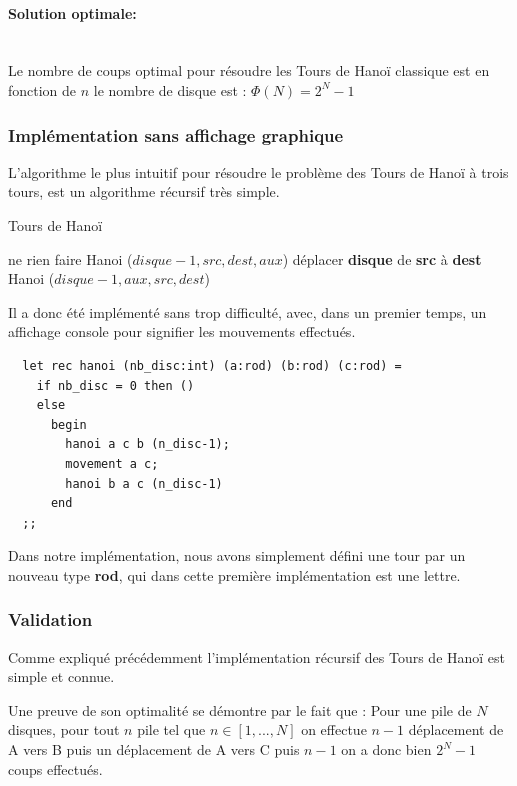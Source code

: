 \documentclass[a4paper,11pt]{article}
\begin{document}
\paragraph{Solution optimale:}\mbox{}\\
Le nombre de coups optimal pour résoudre les Tours de Hanoï classique est en fonction de $n$ le nombre de disque est : \(\Phi(N) = 2^{N}-1\)
\newpage
\subsubsection{Implémentation sans affichage graphique}
\label{sec:algoBase}
L'algorithme le plus intuitif pour résoudre le problème des Tours de Hanoï à trois tours,
est un algorithme récursif très simple.

\begin{algorithm}
  \caption{Tours de Hanoï}\label{algo:hanoi1}
  \begin{algorithmic}[1]
     
    ne rien faire
    \Else
    \State Hanoi ($disque - 1, src, dest, aux$)
    \State déplacer \textbf{disque} de \textbf{src} à \textbf{dest}
    \State Hanoi ($disque - 1, aux, src, dest$)
    \EndIf
    \EndProcedure
\end{algorithmic}
\end{algorithm}

Il a donc été implémenté sans trop difficulté, avec, dans un premier temps,  un affichage console pour signifier les mouvements effectués.
\begin{lstlisting}
  let rec hanoi (nb_disc:int) (a:rod) (b:rod) (c:rod) =
    if nb_disc = 0 then ()
    else
      begin
        hanoi a c b (n_disc-1);
        movement a c;
        hanoi b a c (n_disc-1)
      end
  ;;
\end{lstlisting}

Dans notre implémentation, nous avons simplement défini une tour par un nouveau type \textbf{rod}, qui dans cette première implémentation est une lettre.

\subsubsection{Validation}

Comme expliqué précédemment l'implémentation récursif des Tours de Hanoï est simple et connue.

Une preuve de son optimalité se démontre par le fait que :
Pour une pile de $N$ disques, pour tout $n$ pile tel que $n \in [1,...,N]$ on effectue $n-1$ déplacement de A vers B puis un déplacement de A vers C puis $n-1$ on a donc bien $2^{N} - 1$ coups effectués.
\end{document}
